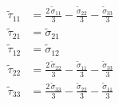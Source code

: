 \begin{align}
\tilde{\tau}_{11} &= \frac{2\,\tilde{\sigma }_{11}}{3}-\frac{\tilde{\sigma }_{22}}{3}-\frac{\tilde{\sigma }_{33}}{3} \\ 
\tilde{\tau}_{21} &= \tilde{\sigma }_{21} \\ 
\tilde{\tau}_{12} &= \tilde{\sigma }_{12} \\ 
\tilde{\tau}_{22} &= \frac{2\,\tilde{\sigma }_{22}}{3}-\frac{\tilde{\sigma }_{11}}{3}-\frac{\tilde{\sigma }_{33}}{3} \\ 
\tilde{\tau}_{33} &= \frac{2\,\tilde{\sigma }_{33}}{3}-\frac{\tilde{\sigma }_{22}}{3}-\frac{\tilde{\sigma }_{11}}{3} 
\end{align}
